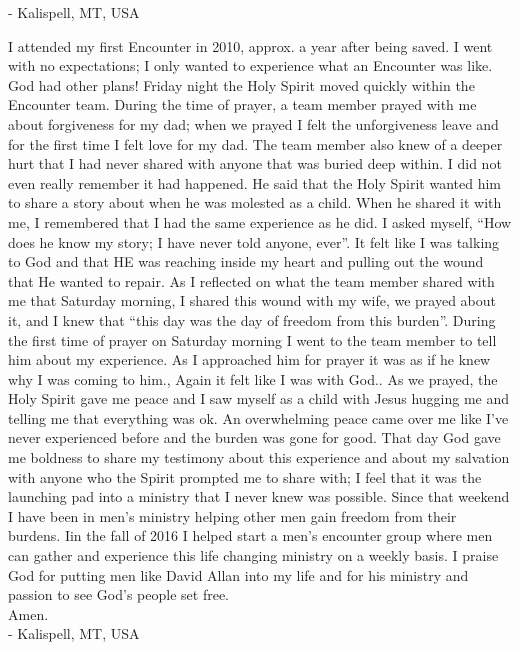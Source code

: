 \documentclass[oneside]{book}
\begin{document}
- Kalispell, MT, USA
\clearpage

I attended my first Encounter in 2010, approx. a year after being saved. I went with no expectations; I only wanted to experience what an Encounter was like. God had other plans!
Friday night the Holy Spirit moved quickly within the Encounter team. During the time of prayer, a team member prayed with me about forgiveness for my dad; when we prayed I felt the unforgiveness leave and for the first time I felt love for my dad. The team member also knew of a deeper hurt that I had never shared with anyone that was buried deep within. I did not even really remember it had happened. He said that the Holy Spirit wanted him to share a story about when he was molested as a child. When he shared it with me, I remembered that I had the same experience as he did. I asked myself, “How does he know my story; I have never told anyone, ever”. It felt like I was talking to God and that HE was reaching inside my heart and pulling out the wound that He wanted to repair.
As I reflected on what the team member shared with me that Saturday morning, I shared this wound with my wife, we prayed about it, and I knew that “this day was the day of freedom from this burden”.
During the first time of prayer on Saturday morning I went to the team member to tell him about my experience. As I approached him for prayer it was as if he knew why I was coming to him., Again it felt like I was with God.. As we prayed, the Holy Spirit gave me peace and I saw myself as a child with Jesus hugging me and telling me that everything was ok. An overwhelming peace came over me like I’ve never experienced before and the burden was gone for good.
That day God gave me boldness to share my testimony about this experience and about my salvation with anyone who the Spirit prompted me to share with; I feel that it was the launching pad into a ministry that I never knew was possible.
Since that weekend I have been in men’s ministry helping other men gain freedom from their burdens. Iin the fall of 2016 I helped start a men’s encounter group where men can gather and experience this life changing ministry on a weekly basis.
I praise God for putting men like David Allan into my life and for his ministry and passion to see God’s people set free.\\

Amen. \\

- Kalispell, MT, USA
\clearpage
\end{document}
